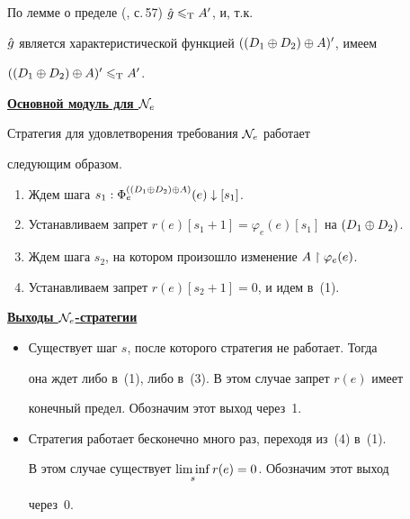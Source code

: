 По лемме о пределе (\cite{So}, с.\,57) $\Hat g\leqslant_{\mathrm T}A'$, и, т.к.


$\Hat g$ является характеристической функцией $((D_1\oplus D_2)\oplus A)'$, имеем


$((D_1\oplus D_2)\oplus A)'\leqslant_{\mathrm T}A'$.


\medskip





\underline{\bf Основной модуль для ${\cal N}_e$}


\medskip





Стратегия для удовлетворения требования ${\cal N}_e$ работает


следующим образом.


\begin{enumerate}


\item Ждем шага $s_1: \Phi_e^{((D_1\oplus D_2)\oplus A)}(e)\downarrow [s_1]$.


\item Устанавливаем запрет $r(e)[s_1+1]=\varphi_{e}(e)[s_1]$ на $(D_1\oplus D_2)$.


\item Ждем шага $s_2$, на котором произошло изменение $A\restriction\varphi_{e}(e)$.


\item Устанавливаем запрет $r(e)[s_2+1]=0$, и идем в~(1).


\end{enumerate}





\underline{\bf Выходы ${\cal N}_e$-стратегии}


\begin{itemize}


\item[1)] Существует шаг $s$, после которого стратегия не работает. Тогда


она ждет либо в~(1), либо в~(3). В этом случае запрет $r(e)$ имеет


конечный предел. Обозначим этот выход через~1.


\item[2)] Стратегия работает бесконечно много раз, переходя из~(4) в~(1).


В этом случае существует $\limi\limits_s r(e)=0$. Обозначим этот выход


через~0.


\end{itemize}





